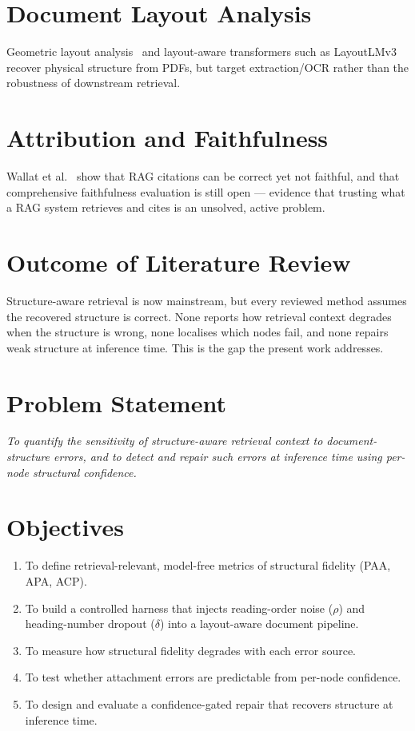 \documentclass[12pt,a4paper]{report}
\begin{document}
\section{Document Layout Analysis}
Geometric layout analysis~\cite{ogorman1993document,breuel2002high} and layout-aware transformers
such as LayoutLMv3~\cite{huang2022layoutlmv3} recover physical structure from PDFs, but target
extraction/OCR rather than the robustness of downstream retrieval.

\section{Attribution and Faithfulness}
Wallat et al.~\cite{wallat2025faith} show that RAG citations can be correct yet not faithful, and
that comprehensive faithfulness evaluation is still open --- evidence that trusting what a RAG system
retrieves and cites is an unsolved, active problem.

\section{Outcome of Literature Review}
Structure-aware retrieval is now mainstream, but every reviewed method assumes the recovered
structure is correct. None reports how retrieval context degrades when the structure is wrong, none
localises which nodes fail, and none repairs weak structure at inference time. This is the gap the
present work addresses.

\section{Problem Statement}
\textit{To quantify the sensitivity of structure-aware retrieval context to document-structure
errors, and to detect and repair such errors at inference time using per-node structural confidence.}

\section{Objectives}
\begin{enumerate}
  \item To define retrieval-relevant, model-free metrics of structural fidelity (PAA, APA, ACP).
  \item To build a controlled harness that injects reading-order noise ($\rho$) and heading-number
  dropout ($\delta$) into a layout-aware document pipeline.
  \item To measure how structural fidelity degrades with each error source.
  \item To test whether attachment errors are predictable from per-node confidence.
  \item To design and evaluate a confidence-gated repair that recovers structure at inference time.
\end{enumerate}
\end{document}
